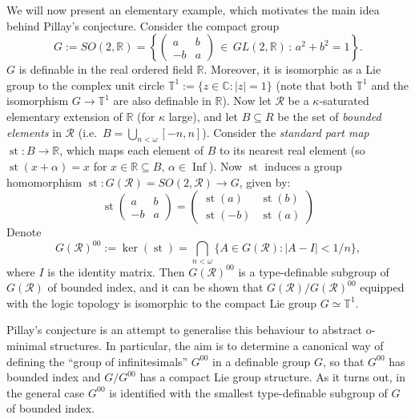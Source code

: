 \documentclass[a4paper]{report}
\newcommand{\ind}{\hspace{15pt}}
\newcommand{\R}{\mathbb{R}}
\newcommand{\Rns}{\mathcal{R}}
\DeclareMathOperator{\Inf}{Inf}
\DeclareMathOperator{\st}{st}
\theoremstyle{definition}
\theoremstyle{remstyle}
\begin{document}
\ind We will now present an elementary example, which motivates the main idea behind Pillay's conjecture. Consider the compact group
\begin{equation*}
	G:=SO(2,\R) = \left\{\begin{pmatrix} a & b \\ -b & a \end{pmatrix}\, \in\, GL(2,\R)\, :\, a^2+b^2=1\right\}.
\end{equation*}
$G$ is definable in the real ordered field $\R$. Moreover, it is isomorphic as a Lie group to the complex unit circle $\mathbb{T}^1:=\{z\in \mathbb{C}: |z|=1\}$ (note that both $\mathbb{T}^1$ and the isomorphism $G\to \mathbb{T}^1$ are also definable in $\R$). Now let $\Rns$ be a $\kappa$-saturated elementary extension of $\R$ (for $\kappa$ large), and let $B\subseteq R$ be the set of \emph{bounded elements} in $\Rns$ (i.e.\ $B=\bigcup_{n<\omega}[-n,n]$). Consider the \emph{standard part map} $\st: B\to \R$, which maps each element of $B$ to its nearest real element (so $\st(x+\alpha)=x$ for $x\in\R\subseteq B$, $\alpha\in\Inf$). Now $\st$ induces a group homomorphism $\st:G(\Rns)=SO(2,\Rns)\to G$, given by:
\begin{equation*}
	\st \begin{pmatrix} a & b \\ -b & a \end{pmatrix} = \begin{pmatrix} \st(a) & \st(b) \\ \st(-b) & \st(a) \end{pmatrix}
\end{equation*}
Denote
\begin{equation*}
	G(\Rns)^{00}:=\ker(\st)=\bigcap_{n<\omega}\{A\in G(\Rns): |A-I|<1/n\},
\end{equation*}
where $I$ is the identity matrix. Then $G(\Rns)^{00}$ is a type-definable subgroup of $G(\Rns)$ of bounded index, and it can be shown that $G(\Rns)/G(\Rns)^{00}$ equipped with the logic topology is isomorphic to the compact Lie group $G\simeq\mathbb{T}^1$.

\ind Pillay's conjecture is an attempt to generalise this behaviour to abstract o-minimal structures. In particular, the aim is to determine a canonical way of defining the ``group of infinitesimals'' $G^{00}$ in a definable group $G$, so that $G^{00}$ has bounded index and $G/G^{00}$ has a compact Lie group structure. As it turns out, in the general case $G^{00}$ is identified with the smallest type-definable subgroup of $G$ of bounded index.
\end{document}
